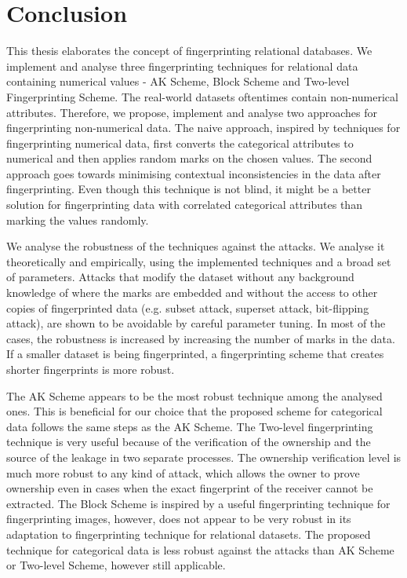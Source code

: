 \chapter{Conclusion}\label{chapter:conclusion}
This thesis elaborates the concept of fingerprinting relational databases. 
We implement and analyse three fingerprinting techniques for relational data containing numerical values - AK Scheme, Block Scheme and Two-level Fingerprinting Scheme. 
The real-world datasets oftentimes contain non-numerical attributes. Therefore, we propose, implement and analyse two approaches for fingerprinting non-numerical data. The naive approach, inspired by techniques for fingerprinting numerical data, first converts the categorical attributes to numerical and then applies random marks on the chosen values. The second approach goes towards minimising contextual inconsistencies in the data after fingerprinting. 
Even though this technique is not blind, it might be a better solution for fingerprinting data with correlated categorical attributes than marking the values randomly.

We analyse the robustness of the techniques against the attacks. We analyse it theoretically and empirically, using the implemented techniques and a broad set of parameters. 
Attacks that modify the dataset without any background knowledge of where the marks are embedded and without the access to other copies of fingerprinted data (e.g. subset attack, superset attack, bit-flipping attack), are shown to be avoidable by careful parameter tuning. In most of the cases, the robustness is increased by increasing the number of marks in the data. 
If a smaller dataset is being fingerprinted, a fingerprinting scheme that creates shorter fingerprints is more robust. 

The AK Scheme appears to be the most robust technique among the analysed ones. This is beneficial for our choice that the proposed scheme for categorical data follows the same steps as the AK Scheme. 
The Two-level fingerprinting technique is very useful because of the verification of the ownership and the source of the leakage in two separate processes. 
The ownership verification level is much more robust to any kind of attack, which allows the owner to prove ownership even in cases when the exact fingerprint of the receiver cannot be extracted.
The Block Scheme is inspired by a useful fingerprinting technique for fingerprinting images, however, does not appear to be very robust in its adaptation to fingerprinting technique for relational datasets. 
The proposed technique for categorical data is less robust against the attacks than AK Scheme or Two-level Scheme, however still applicable.

